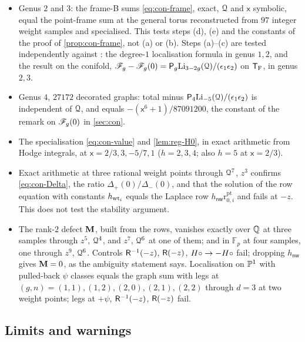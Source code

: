 \begin{itemize}
\item Genus $2$ and $3$: the frame-B sums \cref{eq:con-frame}, exact, $\mathcal{Q}$ and $\mathsf{x}$ symbolic, equal the point-frame sum at the general torus reconstructed from $97$ integer weight samples and specialised. This tests steps (d), (e) and the constants of the proof of \cref{prop:con-frame}, not (a) or (b). Steps (a)--(c) are tested independently against \cite{BS}: the degree-$1$ localisation formula in genus $1,2$, and the result on the conifold, $\mathscr{F}_g-\mathscr{F}_g(0)=\mathsf{P}_g\mathrm{Li}_{3-2g}(\mathcal{Q})/(\epsilon_1\epsilon_2)$ on $\mathsf{T}_{\mathrm{F}}$, in genus $2,3$.
\item Genus $4$, $27172$ decorated graphs: total minus $\mathsf{P}_4\mathrm{Li}_{-5}(\mathcal{Q})/(\epsilon_1\epsilon_2)$ is independent of $\mathcal{Q}$, and equals $-(\mathsf{x}^6+1)/87091200$, the constant of the remark on $\mathscr{F}_g(0)$ in \cref{sec:con}.
\item The specialisation \cref{eq:con-value} and \cref{lem:reg-H0}, in exact arithmetic from Hodge integrals, at $\mathsf{x}=2/3,3,-5/7,1$ ($h=2,3,4$; also $h=5$ at $\mathsf{x}=2/3$).
\item Exact arithmetic at three rational weight points through $\mathcal{Q}^7$, $z^3$ confirms \cref{eq:con-Delta}, the ratio $\Delta_+(0)/\Delta_-(0)$, and that the solution of the row equation with constants $h_{\mathrm{wt}_i}$ equals the Laplace row $h_{\mathsf{nw}}\mathrm{r}^{\mathrm{pt}}_{0,i}$ and fails at $-z$. This does not test the stability argument.
\item The rank-$2$ defect $\mathbf{M}$, built from the rows, vanishes exactly over $\mathbb{Q}$ at three samples through $z^5$, $\mathcal{Q}^4$, and $z^7$, $\mathcal{Q}^6$ at one of them; and in $\mathbb{F}_p$ at four samples, one through $z^9$, $\mathcal{Q}^6$. Controls $\mathsf{R}^{-1}(-z)$, $\mathsf{R}(-z)$, $H\circ\to-H\circ$ fail; dropping $h_{\mathsf{nw}}$ gives $\mathbf{M}=0$, as the ambiguity statement says. Localisation on $\mathbb{P}^1$ with pulled-back $\psi$ classes equals the graph sum with legs at $(g,n)=(1,1),(1,2),(2,0),(2,1),(2,2)$ through $d=3$ at two weight points; legs at $+\psi$, $\mathsf{R}^{-1}(-z)$, $\mathsf{R}(-z)$ fail.
\end{itemize}

\subsection{Limits and warnings}
\label{sec:evi-limits}

